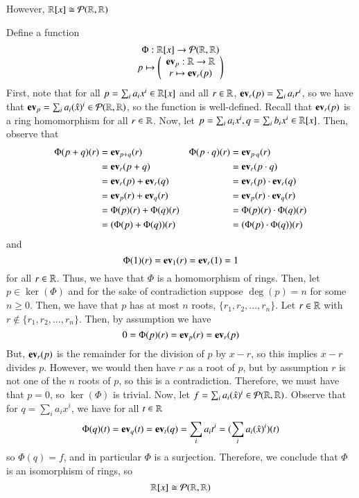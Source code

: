 \documentclass[12pt, a4paper, twoside, openright, titlepage]{book}
\begin{document}
\begin{claim}{}{}
    However, $\mathbb R[x] \cong \mathcal{P}(\mathbb R,\mathbb R)$
\end{claim}
\begin{proof*}{}{}
    Define a function $$\begin{array}{c} \Phi:\mathbb R[x] \rightarrow \mathcal{P}(\mathbb R,\mathbb R) \\ p\mapsto \left(\begin{array}{c} \operatorname{\bf{ev}}_p:\mathbb R\rightarrow \mathbb R \\ r \mapsto \operatorname{\bf{ev}}_r(p) \end{array}\right) \end{array}$$
    First, note that for all $p = \sum_ia_ix^i \in \mathbb R[x]$ and all $r \in \mathbb R$, $\operatorname{\bf{ev}}_r(p) = \sum_ia_ir^i$, so we have that $\operatorname{\bf{ev}}_p = \sum_ia_i(\hat{x})^i \in \mathcal{P}(\mathbb R,\mathbb R)$, so the function is well-defined. Recall that $\operatorname{\bf{ev}}_r(p)$ is a ring homomorphism for all $r \in \mathbb R$. Now, let $p = \sum_ia_ix^i, q = \sum_ib_ix^i \in \mathbb R[x]$. Then, observe that \begin{align*}
        \Phi(p+q)(r) &= \operatorname{\bf{ev}}_{p+q}(r)  & \Phi(p\cdot q)(r) &= \operatorname{\bf{ev}}_{p\cdot q}(r)\\
        &= \operatorname{\bf{ev}}_r(p+q) & &= \operatorname{\bf{ev}}_r(p\cdot q) \\
        &= \operatorname{\bf{ev}}_r(p) + \operatorname{\bf{ev}}_r(q) & &= \operatorname{\bf{ev}}_r(p) \cdot\operatorname{\bf{ev}}_r(q) \\
        &= \operatorname{\bf{ev}}_p(r) + \operatorname{\bf{ev}}_q(r) &  &= \operatorname{\bf{ev}}_p(r) \cdot \operatorname{\bf{ev}}_q(r) \\
        &= \Phi(p)(r) + \Phi(q)(r) & &= \Phi(p)(r) \cdot \Phi(q)(r)\\
        &= (\Phi(p) + \Phi(q))(r) & &= (\Phi(p) \cdot \Phi(q))(r)
    \end{align*}
    and $$\Phi(1)(r) = \operatorname{\bf{ev}}_{1}(r) = \operatorname{\bf{ev}}_r(1) = 1$$
    for all $r \in \mathbb R$. Thus, we have that $\Phi$ is a homomorphism of rings. Then, let $p \in \ker(\Phi)$ and for the sake of contradiction suppose $\deg(p) = n$ for some $n \geq 0$. Then, we have that $p$ has at most $n$ roots, $\{r_1,r_2,...,r_n\}$. Let $r \in \mathbb R$ with $r \notin\{r_1,r_2,...,r_n\}$. Then, by assumption we have $$0 = \Phi(p)(r) = \operatorname{\bf{ev}}_p(r) = \operatorname{\bf{ev}}_r(p)$$
    But, $\operatorname{\bf{ev}}_r(p)$ is the remainder for the division of $p$ by $x - r$, so this implies $x-r$ divides $p$. However, we would then have $r$ as a root of $p$, but by assumption $r$ is not one of the $n$ roots of $p$, so this is a contradiction. Therefore, we must have that $p = 0$, so $\ker(\Phi)$ is trivial. Now, let $f = \sum_ia_i(\hat{x})^i \in \mathcal{P}(\mathbb R,\mathbb R)$. Observe that for $q = \sum_ia_ix^i$, we have for all $t \in \mathbb R$ $$\Phi(q)(t) = \operatorname{\bf{ev}}_q(t) = \operatorname{\bf{ev}}_t(q) = \sum_ia_it^i = (\sum_ia_i(\hat{x})^i)(t)$$
    so $\Phi(q) = f$, and in particular $\Phi$ is a surjection. Therefore, we conclude that $\Phi$ is an isomorphism of rings, so \begin{equation}
        \mathbb R[x] \cong \mathcal{P}(\mathbb R,\mathbb R)
    \end{equation}
\end{proof*}
\end{document}
